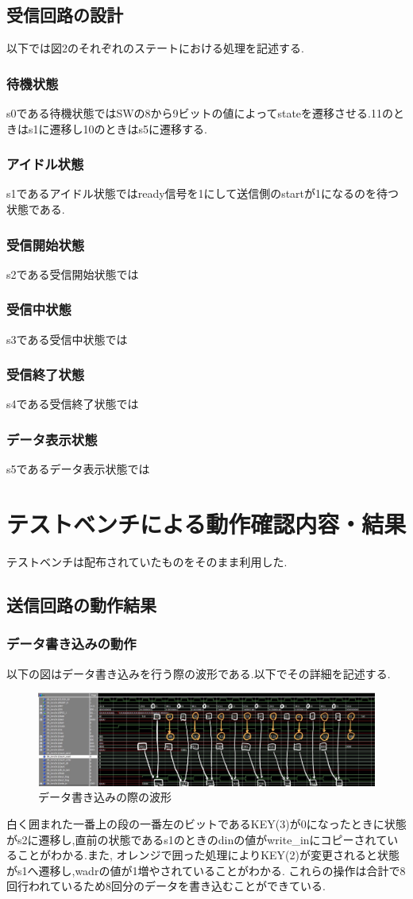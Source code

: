 \documentclass[dvipdfmx]{jarticle}
\begin{document}
\subsection{受信回路の設計}
以下では図2のそれぞれのステートにおける処理を記述する.
\subsubsection{待機状態}
s0である待機状態ではSWの8から9ビットの値によってstateを遷移させる.11のときはs1に遷移し10のときはs5に遷移する.
\subsubsection{アイドル状態}
s1であるアイドル状態ではready信号を1にして送信側のstartが1になるのを待つ状態である.
\subsubsection{受信開始状態}
s2である受信開始状態では
\subsubsection{受信中状態}
s3である受信中状態では
\subsubsection{受信終了状態}
s4である受信終了状態では
\subsubsection{データ表示状態}
s5であるデータ表示状態では
\section{テストベンチによる動作確認内容・結果}
テストベンチは配布されていたものをそのまま利用した.
\subsection{送信回路の動作結果}
\subsubsection{データ書き込みの動作}
以下の図はデータ書き込みを行う際の波形である.以下でその詳細を記述する.
\begin{figure}[h]
  \centering
  \includegraphics[width=12cm]{wave_write.jpg}
  \caption{データ書き込みの際の波形}
\end{figure}
白く囲まれた一番上の段の一番左のビットであるKEY(3)が0になったときに状態がs2に遷移し,直前の状態であるs1のときのdinの値がwrite\_inにコピーされていることがわかる.また,
オレンジで囲った処理によりKEY(2)が変更されると状態がs1へ遷移し,wadrの値が1増やされていることがわかる.
これらの操作は合計で8回行われているため8回分のデータを書き込むことができている.
\end{document}
